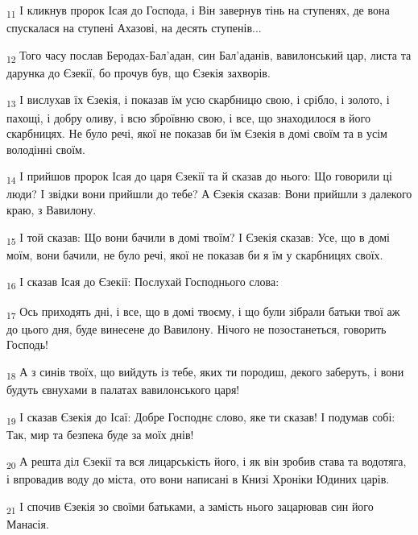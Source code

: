 \begin{tcolorbox}
\textsubscript{11} І кликнув пророк Ісая до Господа, і Він завернув тінь на ступенях, де вона спускалася на ступені Ахазові, на десять ступенів...
\end{tcolorbox}
\begin{tcolorbox}
\textsubscript{12} Того часу послав Беродах-Бал'адан, син Бал'аданів, вавилонський цар, листа та дарунка до Єзекії, бо прочув був, що Єзекія захворів.
\end{tcolorbox}
\begin{tcolorbox}
\textsubscript{13} І вислухав їх Єзекія, і показав їм усю скарбницю свою, і срібло, і золото, і пахощі, і добру оливу, і всю зброївню свою, і все, що знаходилося в його скарбницях. Не було речі, якої не показав би їм Єзекія в домі своїм та в усім володінні своїм.
\end{tcolorbox}
\begin{tcolorbox}
\textsubscript{14} І прийшов пророк Ісая до царя Єзекії та й сказав до нього: Що говорили ці люди? І звідки вони прийшли до тебе? А Єзекія сказав: Вони прийшли з далекого краю, з Вавилону.
\end{tcolorbox}
\begin{tcolorbox}
\textsubscript{15} І той сказав: Що вони бачили в домі твоїм? І Єзекія сказав: Усе, що в домі моїм, вони бачили, не було речі, якої не показав би я їм у скарбницях своїх.
\end{tcolorbox}
\begin{tcolorbox}
\textsubscript{16} І сказав Ісая до Єзекії: Послухай Господнього слова:
\end{tcolorbox}
\begin{tcolorbox}
\textsubscript{17} Ось приходять дні, і все, що в домі твоєму, і що були зібрали батьки твої аж до цього дня, буде винесене до Вавилону. Нічого не позостанеться, говорить Господь!
\end{tcolorbox}
\begin{tcolorbox}
\textsubscript{18} А з синів твоїх, що вийдуть із тебе, яких ти породиш, декого заберуть, і вони будуть євнухами в палатах вавилонського царя!
\end{tcolorbox}
\begin{tcolorbox}
\textsubscript{19} І сказав Єзекія до Ісаї: Добре Господнє слово, яке ти сказав! І подумав собі: Так, мир та безпека буде за моїх днів!
\end{tcolorbox}
\begin{tcolorbox}
\textsubscript{20} А решта діл Єзекії та вся лицарськість його, і як він зробив става та водотяга, і впровадив воду до міста, ото вони написані в Книзі Хроніки Юдиних царів.
\end{tcolorbox}
\begin{tcolorbox}
\textsubscript{21} І спочив Єзекія зо своїми батьками, а замість нього зацарював син його Манасія.
\end{tcolorbox}
